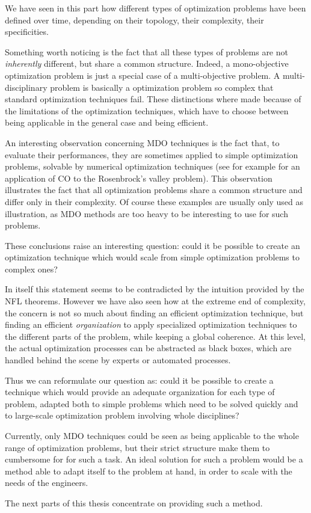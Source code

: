We have seen in this part how different types of optimization problems have been defined over time, depending on their topology, their complexity, their specificities.

Something worth noticing is the fact that all these types of problems are not \emph{inherently} different, but share a common structure.
Indeed, a mono-objective optimization problem is just a special case of a multi-objective problem. A multi-disciplinary problem is basically a optimization problem so complex that standard optimization techniques fail.
These distinctions where made because of the limitations of the optimization techniques, which have to choose between being applicable in the general case and being efficient.

An interesting observation concerning MDO techniques is the fact that, to evaluate their performances, they are sometimes applied to simple optimization problems, solvable by numerical optimization techniques (see for example \cite{Kroo:1994:MOM} for an application of CO to the Rosenbrock's valley problem). This observation illustrates the fact that all optimization problems share a common structure and differ only in their complexity. Of course these examples are usually only used as illustration, as MDO methods are too heavy to be interesting to use for such problems.

These conclusions raise an interesting question: could it be possible to create an optimization technique which would scale from simple optimization problems to complex ones?

In itself this statement seems to be contradicted by the intuition provided by the NFL theorems. However we have also seen how at the extreme end of complexity, the concern is not so much about finding an efficient optimization technique, but finding an efficient \emph{organization} to apply specialized optimization techniques to the different parts of the problem, while keeping a global coherence.
At this level, the actual optimization processes can be abstracted as black boxes, which are handled behind the scene by experts or automated processes.

Thus we can reformulate our question as: could it be possible to create a technique which would provide an adequate organization for each type of problem, adapted both to simple problems which need to be solved quickly and to large-scale optimization problem involving whole disciplines?

Currently, only MDO techniques could be seen as being applicable to the whole range of optimization problems, but their strict structure make them to cumbersome for for such a task.
An ideal solution for such a problem would be a method able to adapt itself to the problem at hand, in order to scale with the needs of the engineers.

The next parts of this thesis concentrate on providing such a method.

